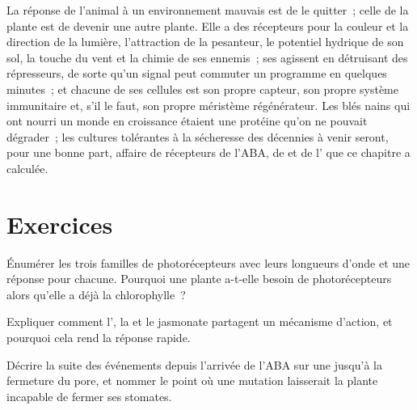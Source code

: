 \begin{remark}\label{rem:b3:plant-molecular-physiology:remark}
La réponse de l'animal à un environnement mauvais est de le quitter~;
celle de la plante est de devenir une autre plante. Elle a des
récepteurs pour la couleur et la direction de la lumière, l'attraction
de la pesanteur, le potentiel hydrique de son sol, la touche du vent et
la chimie de ses ennemis~; ses  agissent en détruisant des
répresseurs, de sorte qu'un signal peut commuter un programme en
quelques minutes~; et chacune de ses cellules est son propre capteur,
son propre système immunitaire et, s'il le faut, son propre méristème
régénérateur. Les blés nains qui ont nourri un monde en croissance
étaient une protéine  qu'on ne pouvait dégrader~; les cultures
tolérantes à la sécheresse des décennies à venir seront, pour une bonne
part, affaire de récepteurs de l'ABA, de  et de
l' que ce chapitre a calculée.
\end{remark}

\section{Exercices}

\begin{exercise}[$\star$]\label{exo:b3:plant-molecular-physiology:1}
Énumérer les trois familles de photorécepteurs avec leurs longueurs
d'onde et une réponse pour chacune. Pourquoi une plante a-t-elle besoin
de photorécepteurs alors qu'elle a déjà la chlorophylle~?
\end{exercise}

\begin{exercise}[$\star$]\label{exo:b3:plant-molecular-physiology:2}
Expliquer comment l', la  et le jasmonate partagent un
mécanisme d'action, et pourquoi cela rend la réponse rapide.
\end{exercise}

\begin{exercise}[$\star$]\label{exo:b3:plant-molecular-physiology:3}
Décrire la suite des événements depuis l'arrivée de l'ABA sur une
 jusqu'à la fermeture du pore, et nommer le point où une
mutation laisserait la plante incapable de fermer ses stomates.
\end{exercise}

